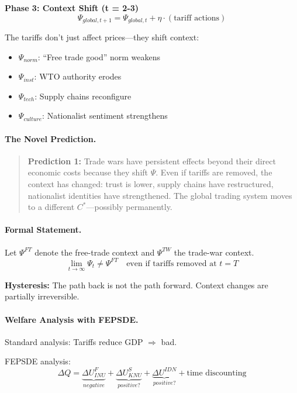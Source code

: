 \documentclass[12pt,a4paper]{article}
\begin{document}
\textbf{Phase 3: Context Shift (t = 2-3)}
\begin{equation}
  \Psi_{global, t+1} = \Psi_{global, t} + \eta \cdot (\text{tariff actions})
\end{equation}

The tariffs don't just affect prices---they shift context:
\begin{itemize}
  \item $\Psi_{norm}$: ``Free trade good'' norm weakens
  \item $\Psi_{inst}$: WTO authority erodes
  \item $\Psi_{tech}$: Supply chains reconfigure
  \item $\Psi_{culture}$: Nationalist sentiment strengthens
\end{itemize}

\paragraph{The Novel Prediction.}
\begin{quote}
\textbf{Prediction 1:} Trade wars have persistent effects beyond their direct
economic costs because they shift $\Psi$. Even if tariffs are removed,
the context has changed: trust is lower, supply chains have restructured,
nationalist identities have strengthened. The global trading system
moves to a different $C^*$---possibly permanently.
\end{quote}

\paragraph{Formal Statement.}
Let $\Psi^{FT}$ denote the free-trade context and $\Psi^{TW}$ the trade-war context.
\begin{equation}
  \lim_{t \to \infty} \Psi_t \neq \Psi^{FT} \quad \text{even if tariffs removed at } t = T
\end{equation}

\textbf{Hysteresis:} The path back is not the path forward.
Context changes are partially irreversible.

\paragraph{Welfare Analysis with FEPSDE.}
Standard analysis: Tariffs reduce GDP $\Rightarrow$ bad.

FEPSDE analysis:
\begin{equation}
  \Delta Q = \underbrace{\Delta U^F_{INU}}_{negative} 
           + \underbrace{\Delta U^S_{KNU}}_{positive?} 
           + \underbrace{\Delta U^{IDN}}_{positive?}
           + \text{time discounting}
\end{equation}
\end{document}
